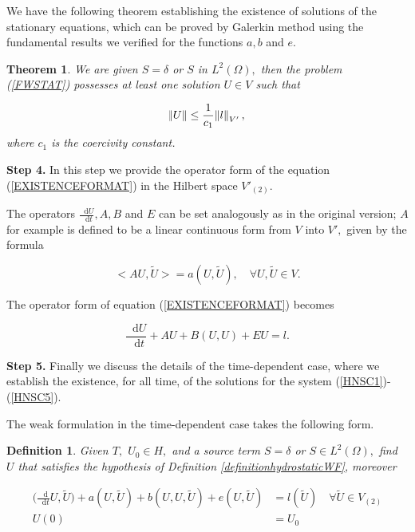 \documentclass[11pt]{article}
\newtheorem{theorem}{Theorem}
\newtheorem{definition}{Definition}
\newcommand*\diff{\mathop{}\!\mathrm{d}}
\begin{document}
We have the following theorem establishing the existence of solutions of the stationary equations, which can be proved by Galerkin method using the fundamental results we verified for the functions $a,b$ and $e$.

\begin{theorem}
We are given $S = \delta$ or $S$ in $L^2(\Omega),$ then the problem (\ref{FWSTAT}) possesses at least one solution $U \in V$ such that

\[ \norm{U} \leq \frac{1}{c_1} \norm{l}_{V'},\] where $c_1$ is the coercivity constant.

\end{theorem}

\textbf{Step 4.} In this step we provide the operator form of the equation (\ref{EXISTENCEFORMAT}) in the Hilbert space $V'_{(2)}$.

The operators $ \frac{\diff U}{\diff t}, A, B$ and $E$ can be set analogously as in the original version; $A$ for example is defined to be a linear continuous form from $V$ into $V',$ given by the formula

\[ <AU, \tilde{U} > =a(U, \tilde{U}), \quad \forall U, \tilde{U} \in V.\]

The operator form of equation (\ref{EXISTENCEFORMAT}) becomes

\[ \frac{\diff U}{\diff t} + AU + B(U,U) + EU = l.\]

\textbf{Step 5.} Finally we discuss the details of the time-dependent case, where we establish the existence, for all time, of the solutions for the system (\ref{HNSC1})-(\ref{HNSC5}).

The weak formulation in the time-dependent case takes the following form.

\begin{definition}

Given $T,$ $U_0 \in H,$ and a source term $S = \delta$ or $S \in L^2(\Omega),$ find $U$ that satisfies the hypothesis of Definition \ref{definitionhydrostaticWF}, moreover

\begin{equation} \label{timedependentWFE}
  \begin{split}
   \bigg ( \frac{\diff}{\diff t} U, \tilde{U} \bigg ) + a(U, \tilde{U}) + b(U,U, \tilde{U})+ e(U, \tilde{U})  & = l(\tilde{U}) \quad \forall \tilde{U} \in V_{(2)} \\
    U(0) &= U_0
 \end{split}
\end{equation}

\end{definition}
\end{document}
